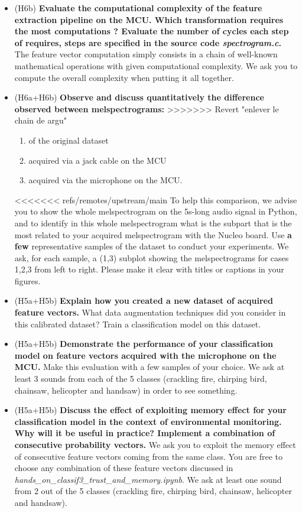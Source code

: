 \begin{itemize}
\begin{itemize}
    \item (H6b) \textbf{Evaluate the computational complexity of the feature extraction pipeline on the MCU. Which transformation requires the most computations ? Evaluate the number of cycles each step of requires, steps are specified in the source code \emph{spectrogram.c}.} \\
The feature vector computation simply consists in a chain of well-known mathematical operations with given computational complexity. We ask you to compute the overall complexity when putting it all together.
\item (H6a+H6b) \textbf{Observe and discuss quantitatively the difference observed between melspectrograms:}
>>>>>>> Revert "enlever le chain de argu"
\begin{enumerate}
    \item of the original dataset
    \item acquired via a jack cable on the MCU
    \item acquired via the microphone on the MCU.
   \end{enumerate}
<<<<<<< refs/remotes/upstream/main
   To help this comparison, we advise you to show the whole melspectrogram on the 5s-long audio signal in Python, and to identify in this whole melspectrogram what is the subpart that is the most related to your acquired melspectrogram with the Nucleo board.
     Use \textbf{a few} representative samples of the dataset to conduct your experiments.
       We ask, for each sample, a (1,3) subplot showing the melspectrograms for cases 1,2,3 from left to right. Please make it clear with titles or captions in your figures.
    \item (H5a+H5b) \textbf{Explain how you created a new dataset of acquired feature vectors.} What data augmentation techniques did you consider in this calibrated dataset? Train a classification model on this dataset. 
    \item (H5a+H5b) \textbf{Demonstrate the performance of your classification model on feature vectors acquired with the microphone on the MCU.}
    Make this evaluation with a few samples of your choice. We ask at least 3 sounds from each of the 5 classes (crackling fire, chirping bird, chainsaw, helicopter and handsaw) in order to see something.
    \item (H5a+H5b) \textbf{Discuss the effect of exploiting memory effect for your classification model in the context of environmental monitoring. Why will it be useful in practice? Implement a combination of consecutive probability vectors.} We ask you to exploit the memory effect of consecutive feature vectors coming from the same class. You are free to choose any combination of these feature vectors discussed in \emph{hands\_on\_classif3\_trust\_and\_memory.ipynb}. We ask at least one sound from 2 out of the 5 classes (crackling fire, chirping bird, chainsaw, helicopter and handsaw).

\end{itemize}
\end{itemize}
